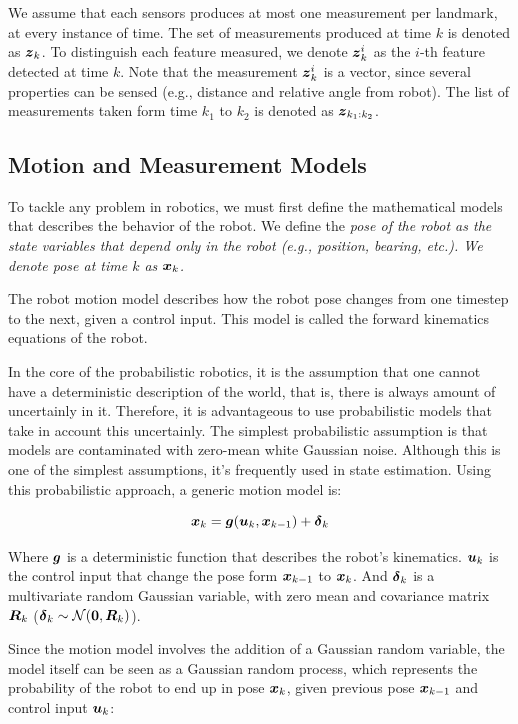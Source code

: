 We assume that each sensors produces at most one measurement per landmark, at every instance of time. The set of measurements produced at time $k$ is denoted as $\boldsymbol{z}_k$. To distinguish each feature measured, we denote $\boldsymbol{z}_k^i$ as the $i$-th feature detected at time $k$. Note that the measurement $\boldsymbol{z}_k^i$ is a vector, since several properties can be sensed (e.g., distance and relative angle from robot). The list of measurements taken form time $k_1$ to $k_2$ is denoted as $\boldsymbol{z}_{k_1:k_2}$.

\subsection{Motion and Measurement Models}

To tackle any problem in robotics, we must first define the mathematical models that describes the behavior of the robot. We define the \it{pose} of the robot as the state variables that depend only in the robot (e.g., position, bearing, etc.). We denote pose at time $k$ as $\boldsymbol{x}_k$. 

The robot motion model describes how the robot pose changes from one timestep to the next, given a control input. This model is called the forward kinematics equations of the robot.

In the core of the probabilistic robotics, it is the assumption that one cannot have a deterministic description of the world, that is, there is always amount of uncertainly in it. Therefore, it is advantageous to use probabilistic models that take in account this uncertainly. The simplest probabilistic assumption is that models are contaminated with zero-mean white Gaussian noise. Although this is one of the simplest assumptions, it's frequently used in state estimation. Using this probabilistic approach, a generic motion model is:

\begin{equation}
\boldsymbol{x}_k = \boldsymbol{g}(\boldsymbol{u}_k, \boldsymbol{x}_{k-1}) + \boldsymbol{\delta}_k
\end{equation}    

Where $\boldsymbol{g}$ is a deterministic function that describes the robot's kinematics. $\boldsymbol{u}_k$ is the control input that change the pose form $\boldsymbol{x}_{k-1}$ to $\boldsymbol{x}_k$. And $\boldsymbol{\delta}_k$ is a multivariate random Gaussian variable, with zero mean and covariance matrix $\boldsymbol{R}_k$ ($\boldsymbol{\delta}_k \sim \mathcal{N}(\boldsymbol{0},\boldsymbol{R}_k)$).

Since the motion model involves the addition of a Gaussian random variable, the model itself can be seen as a Gaussian random process, which represents the probability of the robot to end up in pose $\boldsymbol{x}_k$, given previous pose $\boldsymbol{x}_{k-1}$ and control input $\boldsymbol{u}_k$:

